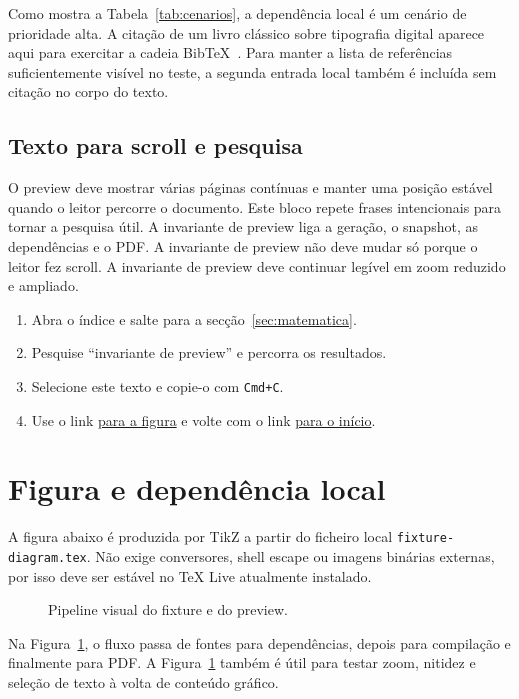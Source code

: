 \documentclass[11pt,a4paper]{article}
\begin{document}
Como mostra a Tabela~\ref{tab:cenarios}, a dependência local é um cenário de
prioridade alta. A citação de um livro clássico sobre tipografia digital
aparece aqui para exercitar a cadeia BibTeX~\cite{knuth1984texbook}.
Para manter a lista de referências suficientemente visível no teste, a
segunda entrada local também é incluída sem citação no corpo do texto.
\nocite{mittelbach2004latex}

\subsection{Texto para scroll e pesquisa}
\label{subsec:scroll}

O preview deve mostrar várias páginas contínuas e manter uma posição estável
quando o leitor percorre o documento. Este bloco repete frases intencionais
para tornar a pesquisa útil. A invariante de preview liga a geração, o
snapshot, as dependências e o PDF. A invariante de preview não deve mudar só
porque o leitor fez scroll. A invariante de preview deve continuar legível em
zoom reduzido e ampliado.

\begin{enumerate}
  \item Abra o índice e salte para a secção~\ref{sec:matematica}.
  \item Pesquise ``invariante de preview'' e percorra os resultados.
  \item Selecione este texto e copie-o com \texttt{Cmd+C}.
  \item Use o link \hyperref[sec:figura]{para a figura} e volte com o link
        \hyperref[sec:como-usar]{para o início}.
\end{enumerate}

\newpage
\section{Figura e dependência local}
\label{sec:figura}

A figura abaixo é produzida por TikZ a partir do ficheiro local
\texttt{fixture-diagram.tex}. Não exige conversores, shell escape ou imagens
binárias externas, por isso deve ser estável no TeX Live atualmente instalado.
\begin{figure}[ht]
  \centering
  
  \caption{Pipeline visual do fixture e do preview.}
  \label{fig:pipeline}
\end{figure}

Na Figura~\ref{fig:pipeline}, o fluxo passa de fontes para dependências, depois
para compilação e finalmente para PDF. A Figura~\ref{fig:pipeline} também é
útil para testar zoom, nitidez e seleção de texto à volta de conteúdo gráfico.
\end{document}
